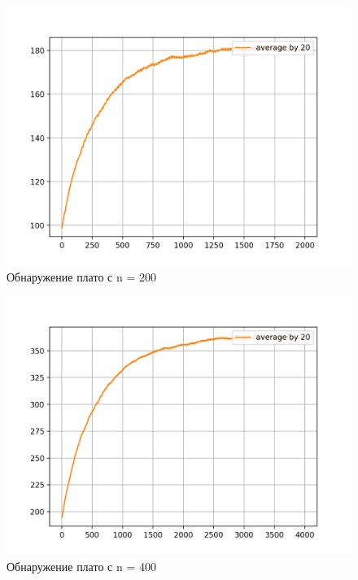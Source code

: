 \documentclass[times,specification,annotation]{itmo-student-thesis}
\begin{document}
    \begin{figure}[H]
        \centering
        \caption{Обнаружение плато с n = 200}
        \label{pic:sublists-metafile}
        \includegraphics[scale=0.8]{plot_d_averaged_200_1_20_2000.png}
    \end{figure}

    \begin{figure}[H]
        \centering
        \caption{Обнаружение плато с n = 400}
        \label{pic:sublists-metafile}
        \includegraphics[scale=0.8]{plot_d_averaged_400_1_20_4000.png}
    \end{figure}
\end{document}
